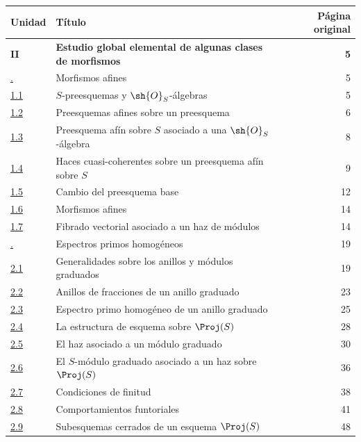 \documentclass[oneside,10pt]{amsart}
\begin{document}
\begingroup
\small
\renewcommand{\arraystretch}{1.04}
\begin{longtable}{@{}p{}p{}r@{}}
\textbf{Unidad} & \textbf{Título} & \textbf{Página original}\\
\hline
\textbf{II} & \textbf{Estudio global elemental de algunas clases de morfismos} & \textbf{5}\\
\hyperref[section:II.1]{\textsection1.} & Morfismos afines & 5\\
\hyperref[subsection:II.1.1]{1.1} & $S$-preesquemas y $\sh{O}_S$-álgebras & 5\\
\hyperref[subsection:II.1.2]{1.2} & Preesquemas afines sobre un preesquema & 6\\
\hyperref[subsection:II.1.3]{1.3} & Preesquema afín sobre $S$ asociado a una $\sh{O}_S$-álgebra & 8\\
\hyperref[subsection:II.1.4]{1.4} & Haces cuasi-coherentes sobre un preesquema afín sobre $S$ & 9\\
\hyperref[subsection:II.1.5]{1.5} & Cambio del preesquema base & 12\\
\hyperref[subsection:II.1.6]{1.6} & Morfismos afines & 14\\
\hyperref[subsection:II.1.7]{1.7} & Fibrado vectorial asociado a un haz de módulos & 14\\
\hyperref[section:II.2]{\textsection2.} & Espectros primos homogéneos & 19\\
\hyperref[subsection:II.2.1]{2.1} & Generalidades sobre los anillos y módulos graduados & 19\\
\hyperref[subsection:II.2.2]{2.2} & Anillos de fracciones de un anillo graduado & 23\\
\hyperref[subsection:II.2.3]{2.3} & Espectro primo homogéneo de un anillo graduado & 25\\
\hyperref[subsection:II.2.4]{2.4} & La estructura de esquema sobre $\Proj(S)$ & 28\\
\hyperref[subsection:II.2.5]{2.5} & El haz asociado a un módulo graduado & 30\\
\hyperref[subsection:II.2.6]{2.6} & El $S$-módulo graduado asociado a un haz sobre $\Proj(S)$ & 36\\
\hyperref[subsection:II.2.7]{2.7} & Condiciones de finitud & 38\\
\hyperref[subsection:II.2.8]{2.8} & Comportamientos funtoriales & 41\\
\hyperref[subsection:II.2.9]{2.9} & Subesquemas cerrados de un esquema $\Proj(S)$ & 48\\

\end{longtable}
\end{document}
